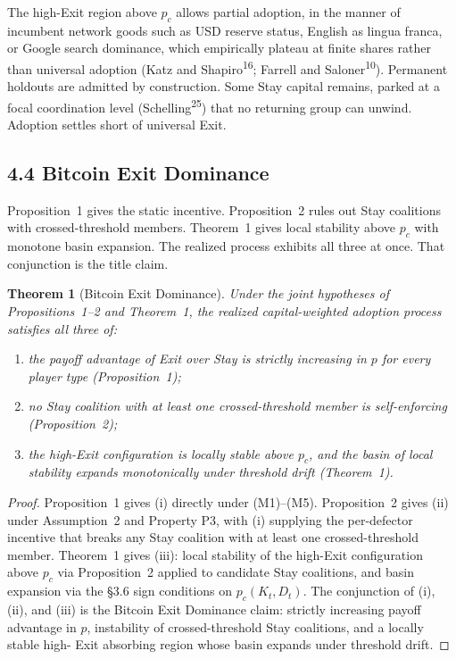 \documentclass[12pt]{article}
\newtheorem{theorem}{Theorem}
\theoremstyle{definition}
\theoremstyle{remark}
\begin{document}
\smallskip
\noindent The high-Exit region above $p_c$ allows partial adoption, in the manner
of incumbent network goods such as USD reserve status, English
as lingua franca, or Google search dominance, which empirically
plateau at finite shares rather than universal adoption (Katz
and Shapiro\textsuperscript{16}; Farrell and
Saloner\textsuperscript{10}). Permanent holdouts are admitted by construction. Some Stay capital remains, parked at a
focal coordination level (Schelling\textsuperscript{25}) that no
returning group can unwind. Adoption settles short of universal Exit.

\subsection{4.4 Bitcoin Exit Dominance}

Proposition~1 gives the static incentive. Proposition~2 rules out Stay coalitions with crossed-threshold members. Theorem~1 gives local stability above $p_c$ with monotone basin expansion. The realized process exhibits all three at once.
That conjunction is the title claim.

\begin{theorem}[Bitcoin Exit Dominance]
Under the joint hypotheses of Propositions~1--2 and Theorem~1,
the realized capital-weighted adoption process satisfies all
three of:
\begin{enumerate}[label=(\roman*),nosep]
\item the payoff advantage of Exit over Stay is strictly increasing
in $p$ for every player type (Proposition~1);
\item no Stay coalition with at least one crossed-threshold
member is self-enforcing (Proposition~2);
\item the high-Exit configuration is locally stable above
$p_c$, and the basin of local stability expands monotonically
under threshold drift (Theorem~1).
\end{enumerate}
\end{theorem}

\begin{proof}
Proposition~1 gives (i) directly under (M1)--(M5). Proposition~2
gives (ii) under Assumption~2 and Property P3, with (i) supplying
the per-defector incentive that breaks any Stay coalition with
at least one crossed-threshold member. Theorem~1 gives (iii):
local stability of the high-Exit configuration above $p_c$ via
Proposition~2 applied to candidate Stay coalitions, and basin
expansion via the \S3.6 sign conditions on $p_c(K_t, D_t)$. The
conjunction of (i), (ii), and (iii) is the Bitcoin Exit Dominance claim:
strictly increasing payoff advantage in $p$, instability of
crossed-threshold Stay coalitions, and a locally stable high-
Exit absorbing region whose basin expands under threshold drift.
\end{proof}
\end{document}
